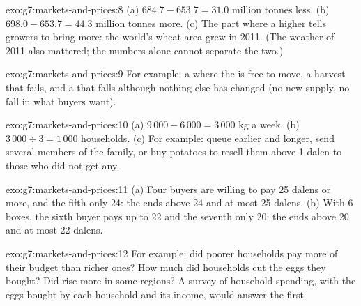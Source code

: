 \begin{solution}{exo:g7:markets-and-prices:8}
(a) $684.7 - 653.7 = 31.0$ million tonnes less. (b) $698.0 - 653.7 = 44.3$ million tonnes
more. (c) The part where a higher  tells growers to bring more: the world's wheat area
grew in 2011. (The weather of 2011 also mattered; the numbers alone cannot separate the two.)
\end{solution}

\begin{solution}{exo:g7:markets-and-prices:9}
For example: a  where the  is free to move, a harvest that fails, and a  that
falls although nothing else has changed (no new supply, no fall in what buyers want).
\end{solution}

\begin{solution}{exo:g7:markets-and-prices:10}
(a) $9\,000 - 6\,000 = 3\,000$ kg a week. (b) $3\,000 \div 3 = 1\,000$ households. (c) For
example: queue earlier and longer, send several members of the family, or buy potatoes to
resell them above 1 dalen to those who did not get any.
\end{solution}

\begin{solution}{exo:g7:markets-and-prices:11}
(a) Four buyers are willing to pay 25 dalens or more, and the fifth only 24: the  ends
above 24 and at most 25 dalens. (b) With 6 boxes, the sixth buyer pays up to 22 and the
seventh only 20: the  ends above 20 and at most 22 dalens.
\end{solution}

\begin{solution}{exo:g7:markets-and-prices:12}
For example: did poorer households pay more of their budget than richer ones? How much did
households cut the eggs they bought? Did  rise more in some regions? A survey of
household spending, with the eggs bought by each household and its income, would answer the
first.
\end{solution}


